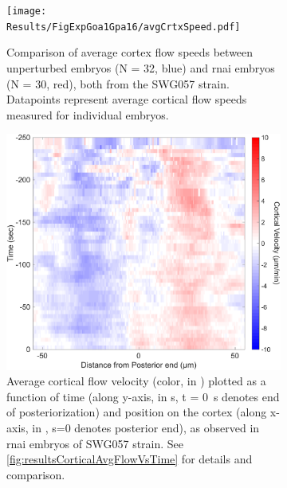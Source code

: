 \begin{figure}
\centering
\begin{subfigure}[t]{0.25\textwidth}
    \centering
    \texttt{[image: Results/FigExpGoa1Gpa16/avgCrtxSpeed.pdf]}
    \caption{Comparison of average cortex flow speeds between unperturbed embryos (N = 32, blue) and  \ac{rnai} embryos (N = 30, red), both from the SWG057 strain. Datapoints represent average cortical flow speeds measured for individual embryos.} 
    \label{subfig:swg057Goa1Gpa16CrtxFlow-avgSpeed}
\end{subfigure}
\hfill
\begin{subfigure}[t]{0.3\textwidth}
    \centering
    \includegraphics[width=\textwidth]{Results/FigExpGoa1Gpa16/goa1gpa16_corticalflow_timeFig.pdf}
    \caption{Average cortical flow velocity (color, in \si{\unitCrtxVel}) plotted as a function of time (along y-axis, in \si{\second}, t = \SI{0}{\second} denotes end of posteriorization) and position on the cortex (along x-axis, in \si{\unitLength}, s=\SI{0}{\unitLength} denotes posterior end), as observed in  \ac{rnai} embryos of SWG057 strain. See \autoref{fig:resultsCorticalAvgFlowVsTime} for details and comparison.} 
    \label{subfig:swg057Goa1Gpa16CrtxFlow-VsTime}
\end{subfigure}
\hfill
\begin{subfigure}[t]{0.3\textwidth}
    \centering

\end{subfigure}
\end{figure}
